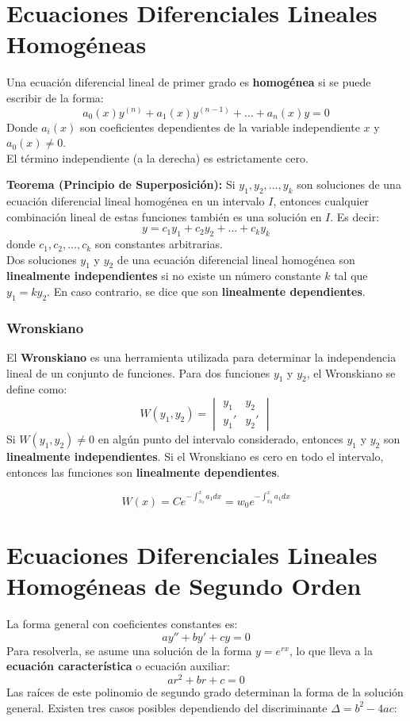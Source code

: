 \documentclass[a4paper,12pt]{article}
\begin{document}
\section{Ecuaciones Diferenciales Lineales Homogéneas}
Una ecuación diferencial lineal de primer grado es \textbf{homogénea} si se puede escribir de la forma:
$$ a_0(x)y^{(n)} + a_1(x)y^{(n-1)} + \dots + a_n(x)y = 0 $$
Donde $a_i(x)$ son coeficientes dependientes de la variable independiente $x$ y $a_0(x) \neq 0$.
\\El término independiente (a la derecha) es estrictamente cero.

\textbf{Teorema (Principio de Superposición):}
Si $y_1, y_2, \dots, y_k$ son soluciones de una ecuación diferencial lineal homogénea en un intervalo $I$, entonces cualquier combinación lineal de estas funciones también es una solución en $I$. Es decir:
$$ y = c_1y_1 + c_2y_2 + \dots + c_ky_k $$
donde $c_1, c_2, \dots, c_k$ son constantes arbitrarias.
\\[5mm]
Dos soluciones $y_1$ y $y_2$ de una ecuación diferencial lineal homogénea son \textbf{linealmente independientes} si no existe un número constante $k$ tal que $y_1 = ky_2$. En caso contrario, se dice que son \textbf{linealmente dependientes}.

\subsubsection{Wronskiano}
El \textbf{Wronskiano} es una herramienta utilizada para determinar la independencia lineal de un conjunto de funciones. Para dos funciones $y_1$ y $y_2$, el Wronskiano se define como:
$$ W(y_1, y_2) = \begin{vmatrix}
y_1 & y_2 \\
y_1' & y_2'
\end{vmatrix} $$
Si $W(y_1, y_2) \neq 0$ en algún punto del intervalo considerado, entonces $y_1$ y $y_2$ son \textbf{linealmente independientes}. Si el Wronskiano es cero en todo el intervalo, entonces las funciones son \textbf{linealmente dependientes}.

\begin{tcolorbox}[colback=blue!5!white,colframe=blue!75!black,title=Teorema de Liouville]
$$ W(x) = Ce^{-\int_{x_0}^{x} a_{1}dx} = w_0e^{-\int_{x_0}^{x} a_{1}dx}$$
\end{tcolorbox}


\section{Ecuaciones Diferenciales Lineales Homogéneas de Segundo Orden}
La forma general con coeficientes constantes es:
$$ ay'' + by' + cy = 0 $$
Para resolverla, se asume una solución de la forma $y = e^{rx}$, lo que lleva a la \textbf{ecuación característica} o ecuación auxiliar:
$$ ar^2 + br + c = 0 $$
Las raíces de este polinomio de segundo grado determinan la forma de la solución general. Existen tres casos posibles dependiendo del discriminante $\Delta = b^2 - 4ac$:
\end{document}
